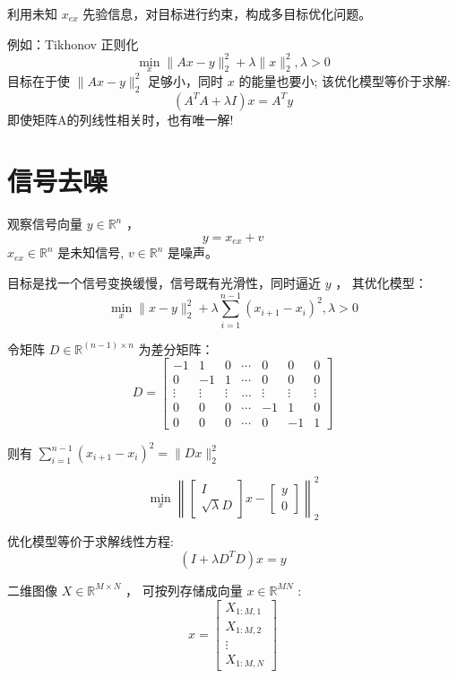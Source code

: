 利用未知 $ x_{e x} $ 先验信息，对目标进行约束，构成多目标优化问题。 

例如：Tikhonov 正则化
$$
\min _{x}\|A x-y\|_{2}^{2}+\lambda\|x\|_{2}^{2}, \lambda>0
$$
目标在于使 $ \|A x-y\|_{2}^{2} $ 足够小，同时 $ x $ 的能量也要小; 该优化模型等价于求解:
$$
\left(A^{T} A+\lambda I\right) x=A^{T} y
$$
即使矩阵A的列线性相关时，也有唯一解!

\section{信号去噪}

观察信号向量 $ y \in \mathbb{R}^{n} $ ，
$$
y=x_{e x}+v
$$
$ x_{e x} \in \mathbb{R}^{n} $ 是未知信号, $ v \in \mathbb{R}^{n} $ 是噪声。

目标是找一个信号变换缓慢，信号既有光滑性，同时逼近 $ y $ ， 其优化模型：
$$
\min _{x}\|x-y\|_{2}^{2}+\lambda \sum_{i=1}^{n-1}\left(x_{i+1}-x_{i}\right)^{2}, \lambda>0
$$

\begin{definition}[差分矩阵]
    令矩阵 $ D \in \mathbb{R}^{(n-1) \times n} $ 为差分矩阵：
$$ D=\left[\begin{array}{ccccccc}-1 & 1 & 0 & \cdots & 0 & 0 & 0 \\ 0 & -1 & 1 & \cdots & 0 & 0 & 0 \\ \vdots & \vdots & \vdots & \ldots & \vdots & \vdots & \vdots \\ 0 & 0 & 0 & \cdots & -1 & 1 & 0 \\ 0 & 0 & 0 & \cdots & 0 & -1 & 1\end{array}\right] $$

\end{definition}


则有 $ \sum_{i=1}^{n-1}\left(x_{i+1}-x_{i}\right)^{2}=\|D x\|_{2}^{2} $

$$ \min _{x}\left\|\left[\begin{array}{c}I \\ \sqrt{\lambda} D\end{array}\right] x-\left[\begin{array}{l}y \\ 0\end{array}\right]\right\|_{2}^{2} $$

优化模型等价于求解线性方程:
$$
\left(I+\lambda D^{T} D\right) x=y
$$

二维图像 $ X \in \mathbb{R}^{M \times N} $ ， 可按列存储成向量 $ x \in \mathbb{R}^{M N} $ :
$$
x=\left[\begin{array}{c}
X_{1: M, 1} \\
X_{1: M, 2} \\
\vdots \\
X_{1: M, N}
\end{array}\right] $$ 

